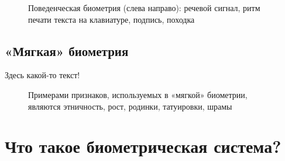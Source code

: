 \documentclass[12pt]{book}
\begin{document}
\begin{figure}[h]
\caption{Поведенческая биометрия (слева направо): речевой сигнал, ритм печати текста на клавиатуре, подпись, походка}
\label{fig:figure_1_5}
\end{figure}

\subsection{«Мягкая» биометрия}

\large{Здесь какой-то текст!}

\begin{figure}[h]
\caption{Примерами признаков, используемых в «мягкой» биометрии, являются этничность, рост, родинки, татуировки, шрамы}
\label{fig:figure_1_6}
\end{figure}

\section{Что такое биометрическая система?}
\end{document}

